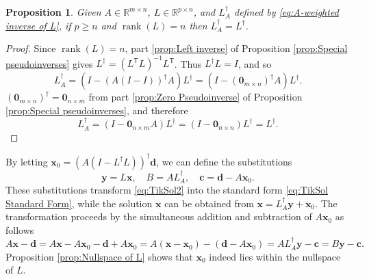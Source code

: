 \documentclass[12pt]{article}
\newcommand{\cVec}{\mathbf{c}}	%
\newcommand{\dVec}{\mathbf{d}}	%
\newcommand{\xVec}{\mathbf{x}}	%
\newcommand{\yVec}{\mathbf{y}}	%
\newcommand{\trans}[1]{{#1}^\mathsf{T}}	%
\newcommand{\inv}[1]{{#1}^{-1}}	%
\newcommand{\pinv}[1]{{#1}^\dagger}	%
\DeclareMathOperator{\rank}{rank}	%
\newcommand{\zeroVec}{\bm{0}}	%
\newtheorem{proposition}{Proposition}[section]
\begin{document}
\begin{proposition}
\label{prop:Pseudoinverse of L}
Given $A \in \mathbb{R}^{m \times n}$, $L \in \mathbb{R}^{p \times n}$, and $\pinv{L}_A$ defined by \eqref{eq:A-weighted inverse of L}, if $p \geq n$ and $\rank(L) = n$ then $\pinv{L}_A = \pinv{L}$.
\end{proposition}
\begin{proof}
Since $\rank(L) = n$, part \ref{prop:Left inverse} of Proposition \ref{prop:Special pseudoinverses} gives $\pinv{L} = \inv{\left(\trans{L}L\right)}\trans{L}$. Thus $\pinv{L}L = I$, and so
\[\pinv{L}_A = \left(I - \pinv{\left(A\left(I - I\right)\right)}A\right)\pinv{L} = \left(I - \pinv{\left(\zeroVec_{m \times n}\right)}A\right)\pinv{L}.\]
$\pinv{\left(\zeroVec_{m \times n}\right)} = \zeroVec_{n \times m}$ from part \ref{prop:Zero Pseudoinverse} of Proposition \ref{prop:Special pseudoinverses}, and therefore
\[\pinv{L}_A = \left(I - \zeroVec_{n \times m}A\right)\pinv{L} = \left(I - \zeroVec_{n \times n}\right)\pinv{L} = \pinv{L}.\]
\end{proof}
\noindent By letting $\xVec_0 = \pinv{\left(A\left(I - \pinv{L}L\right)\right)}\dVec$, we can define the substitutions
\begin{equation}
\label{eq:Standard Form Substitutions}
    \yVec = L\xVec, \quad B = A\pinv{L}_A, \quad \cVec = \dVec - A\xVec_0.
\end{equation}
These substitutions transform \eqref{eq:TikSol2} into the standard form \eqref{eq:TikSol Standard Form}, while the solution $\xVec$ can be obtained from $\xVec = \pinv{L}_A \yVec + \xVec_0$. The transformation proceeds by the simultaneous addition and subtraction of $A\xVec_0$ as follows
\[A\xVec - \dVec = A\xVec - A\xVec_0 - \dVec + A\xVec_0 = A\left(\xVec - \xVec_0\right) - \left(\dVec - A\xVec_0\right) = A\pinv{L}_A \yVec - \cVec = B\yVec - \cVec.\]
Proposition \ref{prop:Nullspace of L} shows that $\xVec_0$ indeed lies within the nullspace of $L$.
\end{document}
